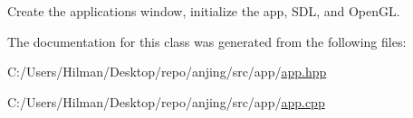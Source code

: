 Create the applications\textquotesingle{} window, initialize the app, S\+D\+L, and Open\+G\+L. 



The documentation for this class was generated from the following files\+:\begin{DoxyCompactItemize}
\item 
C\+:/\+Users/\+Hilman/\+Desktop/repo/anjing/src/app/\hyperlink{app_8hpp}{app.\+hpp}\item 
C\+:/\+Users/\+Hilman/\+Desktop/repo/anjing/src/app/\hyperlink{app_8cpp}{app.\+cpp}\end{DoxyCompactItemize}
